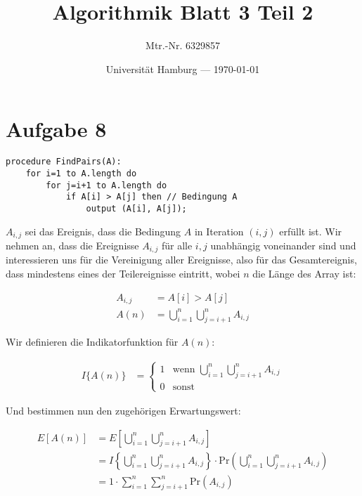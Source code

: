 \documentclass[parskip=half,a4paper]{scrartcl}
\title{Algorithmik Blatt 3 Teil 2}
\author{Mtr.-Nr. 6329857}
\date{Universität Hamburg --- \today}
\begin{document}
\maketitle %

\linenumbers

\section*{Aufgabe 8}

\begin{verbatim}
procedure FindPairs(A):
    for i=1 to A.length do
        for j=i+1 to A.length do
            if A[i] > A[j] then // Bedingung A
                output (A[i], A[j]);
\end{verbatim}


$A_{i,j}$ sei das Ereignis, dass die Bedingung $A$ in Iteration $(i,j)$ erfüllt ist. Wir nehmen an, dass die Ereignisse $A_{i,j}$ für alle $i,j$ unabhängig voneinander sind und interessieren uns für die Vereinigung aller Ereignisse, also für das Gesamtereignis, dass mindestens eines der Teilereignisse eintritt, wobei $n$ die Länge des Array ist:

\begin{equation}
\begin{aligned}
A_{i,j} &= A[i] > A[j]\\
A(n) &= \bigcup_{i=1}^{n}{\bigcup_{j=i+1}^n}A_{i,j}
\end{aligned}
\end{equation}

Wir definieren die Indikatorfunktion für $A(n)$:

\begin{equation}
\begin{aligned}
I\{A(n)\} &= \begin{cases}
1 & \text{wenn $\bigcup_{i=1}^{n}{\bigcup_{j=i+1}^n}A_{i,j}$}\\
0 & \text{sonst}
\end{cases}
\end{aligned}
\end{equation}

Und bestimmen nun den zugehörigen Erwartungswert:

\begin{equation}
\begin{aligned}
   E\left[A(n)\right] &= E\left[\bigcup_{i=1}^n{\bigcup_{j=i+1}^n}A_{i,j}\right] \\
    &= I\left\{\bigcup_{i=1}^n{\bigcup_{j=i+1}^n}A_{i,j}\right \} \cdot \text{Pr}\left(\bigcup_{i=1}^n{\bigcup_{j=i+1}^n}A_{i,j}\right) \\
   &= 1 \cdot \sum_{i=1}^n{\sum_{j=i+1}^n}\text{Pr}\left(A_{i,j}\right)
\end{aligned}
\end{equation}
\end{document}

